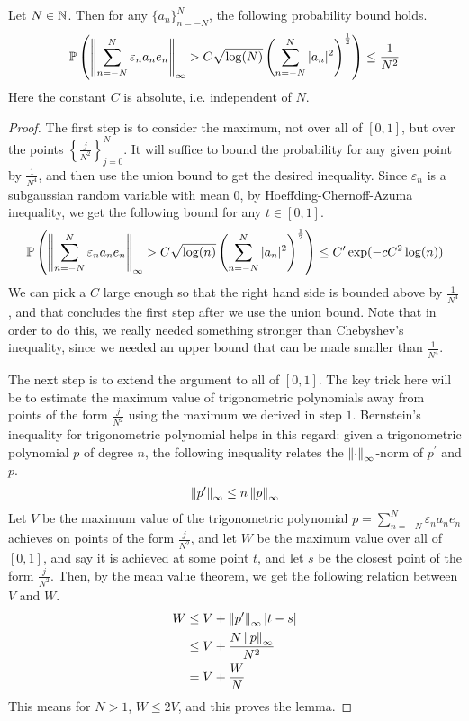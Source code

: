 \documentclass[11pt]{article}
\begin{document}
\begin{lemma}
  \label{lem:main-technical-lemma}
  Let $N \in \mathbb{N}$.
  Then for any $\{a_n\}_{n=-N}^N$, the following probability bound holds.
  \begin{align*}
    \mathbb{P}\left( \left\lVert \sum_{n=-N}^N \varepsilon_n a_n e_n \right\rVert_{\infty} >  C \sqrt{\log(N)} \left( \sum_{n=-N}^N |a_n|^2 \right)^{\frac{1}{2}} \right) \leq \frac{1}{N^2}
  \end{align*}
  Here the constant $C$ is absolute, i.e. independent of $N$.
\end{lemma}
\begin{proof}
  The first step is to consider the maximum, not over all of $[0,1]$, but over the points $\left\{ \frac{j}{N^2} \right\}_{j = 0}^N$.
  It will suffice to bound the probability for any given point by $\frac{1}{N^4}$, and then use the union bound to get the desired inequality.
  Since $\varepsilon_n$ is a subgaussian random variable with mean $0$, by Hoeffding-Chernoff-Azuma inequality, we get the following bound for any $t \in [0,1]$.
  \begin{align*}
    \mathbb{P}\left( \left\lVert \sum_{n=-N}^N \varepsilon_n a_n e_n \right\rVert_{\infty} >  C \sqrt{\log(n)} \left( \sum_{n=-N}^N |a_n|^2 \right)^{\frac{1}{2}} \right) \leq C^{\prime} \exp(-cC^2 \log(n))
  \end{align*}
  We can pick a $C$ large enough so that the right hand side is bounded above by $\frac{1}{N^4}$, and that concludes the first step after we use the union bound.
  Note that in order to do this, we really needed something stronger than Chebyshev's inequality, since we needed an upper bound that can be made smaller than $\frac{1}{N^4}$.

  The next step is to extend the argument to all of $[0,1]$.
  The key trick here will be to estimate the maximum value of trigonometric polynomials away from points of the form $\frac{j}{N^2}$ using the maximum we derived in step $1$.
  Bernstein's inequality for trigonometric polynomial helps in this regard: given a trigonometric polynomial $p$ of degree $n$, the following inequality relates the $\left\lVert\cdot\right\rVert_{\infty}$-norm of $p^{\prime}$ and $p$.
  \begin{align*}
    \left\lVert p^{\prime}\right\rVert_{\infty} \leq n \left\lVert p\right\rVert_{\infty}
  \end{align*}
  Let $V$ be the maximum value of the trigonometric polynomial $p = \sum_{n=-N}^N \varepsilon_n a_n e_n$ achieves on points of the form $\frac{j}{N^2}$, and let $W$ be the maximum value over all of $[0,1]$, and say it is achieved at some point $t$, and let $s$ be the closest point of the form $\frac{j}{N^2}$.
  Then, by the mean value theorem, we get the following relation between $V$ and $W$.
  \begin{align*}
    W &\leq V + \left\lVert p^{\prime}\right\rVert_{\infty} |t-s| \\
      &\leq V + \frac{N \left\lVert p\right\rVert_{\infty}}{N^2} \\
      &= V + \frac{W}{N}
  \end{align*}
  This means for $N > 1$, $W \leq 2V$, and this proves the lemma.
\end{proof}
\end{document}
